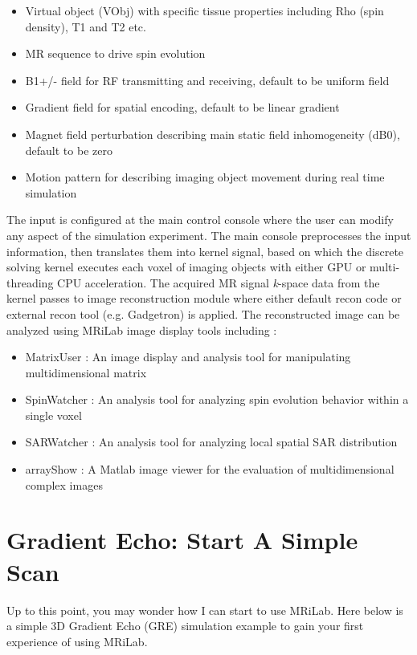 \documentclass{book}%
\begin{document}
\begin{itemize}
	\item Virtual object (VObj) with specific tissue properties including Rho (spin density), T1 and T2 etc.
	\item MR sequence to drive spin evolution
	\item B1+/- field for RF transmitting and receiving, default to be uniform field
	\item Gradient field for spatial encoding, default to be linear gradient
	\item Magnet field perturbation describing main static field inhomogeneity (dB0), default to be zero
	\item Motion pattern for describing imaging object movement during real time simulation
\end{itemize}

The input is configured at the main control console where the user can modify any aspect of the simulation experiment. The main console preprocesses the input information, then translates them into kernel signal, based on which the discrete solving kernel executes each voxel of imaging objects with either GPU or multi-threading CPU acceleration. The acquired MR signal \textit{k}-space data from the kernel passes to image reconstruction module where either default recon code or external recon tool (e.g. Gadgetron) is applied. The reconstructed image can be analyzed using MRiLab image display tools including :

\begin{itemize}
	\item MatrixUser : An image display and analysis tool for manipulating multidimensional matrix
	\item SpinWatcher : An analysis tool for analyzing spin evolution behavior within a single voxel
	\item SARWatcher : An analysis tool for analyzing local spatial SAR distribution
	\item arrayShow : A Matlab image viewer for the evaluation of multidimensional complex images
\end{itemize}

\section{Gradient Echo: Start A Simple Scan}

Up to this point, you may wonder how I can start to use MRiLab. Here below is a simple 3D Gradient Echo (GRE) simulation example to gain your first experience of using MRiLab.
\end{document}
